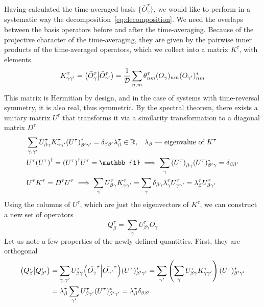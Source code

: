 Having calculated the time-averaged basis \( \{\bar{O}_{\gamma}^{\tau}\} \), we would like to perform in a 
systematic way the decomposition~\ref{eq:decomposition}. We need the overlaps between the basis operators
before and after the time-averaging. Because of the projective character of the time-averaging, they are
given by the pairwise inner products of the time-averaged operators, which we collect into a matrix
\(K^{\tau}\), with elements
\begin{equation}
    K^{\tau}_{\gamma\gamma^{\prime}} = \left(\bar{O}_{\gamma}^{\tau} \middle| \bar{O}_{\gamma^{\prime}}^{\tau}\right) = \frac{1}{\mathcal{D}}\sum_{n,m} \theta_{nm}^{\tau} (O_{\gamma})_{nm} (O_{\gamma^{\prime}})_{nm}^{\ast}
    \label{eq:overlap_matrix}
\end{equation}
This matrix is Hermitian by design, and in the case of systems with time-reversal symmetry, it is also real,
thus symmetric. By the spectral theorem, there exists a unitary matrix \(U^{\tau}\) that transforms it
via a similarity transformation to a diagonal matrix \(D^{\tau}\)
\begin{align}
    &\sum_{\gamma,\gamma^{\prime}} U^{\tau}_{\beta \gamma} K_{\gamma\gamma^{\prime}}^{\tau} {(U^{\tau})}_{\beta^{\prime} \gamma^{\prime}}^{\ast}=\delta_{\beta\beta^{\prime}} \lambda^{\tau}_{\beta} \in
     \RR,\;\;\; \lambda_{\beta} \text{ --- eigenvalue of }K^{\tau} \label{eq:property diag} \\
    &U^{\tau}{(U^{\tau})}^{\dag} = {(U^{\tau})}^{\dag}U^{\tau} = \mathbb{1} \implies \sum_{\gamma} {(U^{\tau})}_{\beta\gamma}(U^{\tau})_{\beta^{\prime}\gamma}^{\ast} =
     \delta_{\beta\beta^{\prime}} \label{eq:propery_ortho}\\
    & U^{\tau} K^{\tau} = D^{\tau} U^{\tau} \implies \sum_{\gamma} U^{\tau}_{\beta\gamma} K_{\gamma\gamma^{\prime}}^{\tau} = \sum_{\gamma}  \delta_{\beta\gamma} \lambda^{\tau}_{\gamma} U^{\tau}_{\gamma\gamma^{\prime}} = \lambda^{\tau}_{\beta} U^{\tau}_{\beta\gamma^{\prime}}\label{eq:property}
  \end{align} 
Using the columns of \(U^{\tau}\), which are just the eigenvectors of \(K^{\tau}\), we can construct a new set of operators
\begin{equation}
    Q_{\beta}^{\tau} = \sum_{\gamma} U^{\tau}_{\beta \gamma} \bar{O}_{\gamma}^{\tau}
    \label{eq:liom}
\end{equation}
Let us note a few properties of the newly defined quantities. First, they are orthogonal
\begin{align}
    \left(Q^{\tau}_\beta \middle| Q^{\tau}_{\beta^{\prime}}\right) &= \sum_{\gamma,\gamma^{\prime}} U^{\tau}_{\beta\gamma} {\left(\bar{O_{\gamma}}^{\tau} \middle| \bar{O_{\gamma^{\prime}}}^{\tau}\right)} (U^{\tau})_{\beta^{\prime}\gamma^{\prime}}^{\ast} 
    = \sum_{\gamma^{\prime}} \left(\sum_{\gamma}U^{\tau}_{\beta\gamma} K_{\gamma\gamma^{\prime}}^{\tau}\right)  (U^{\tau})_{\beta^{\prime}{\gamma^{\prime}}}^{\ast}\nonumber \\ 
    &= \lambda^{\tau}_{\beta} \sum_{\gamma^{\prime}} U^{\tau}_{\beta\gamma^{\prime}} (U^{\tau})_{\beta^{\prime}\gamma^{\prime}}^{\ast} = \lambda^{\tau}_{\beta} \delta_{\beta\beta^{\prime}}
  \end{align}
